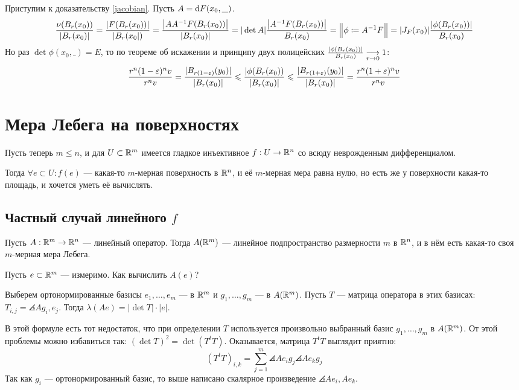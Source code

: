 \documentclass[a4paper]{report}
\begin{document}
    Приступим к доказательству \eqref{jacobian}.
    Пусть $A = \operatorname{d}\! F(x_0, \_)$.
    \[\frac{\nu(B_r(x_0))}{|B_r(x_0)|} = \frac{|F(B_r(x_0))|}{|B_r(x_0|)} = \frac{\left|AA^{-1}F(B_r(x_0))\right|}{\left|B_r(x_0)\right|} = |\det A|\frac{\left|A^{-1}F(B_r(x_0))\right|}{B_r(x_0)} =\Big\|\phi \coloneqq A^{-1}F\Big\|= |J_F(x_0)|\frac{|\phi(B_r(x_0))|}{B_r(x_0)}\]
    Но раз $\det \phi(x_0, \_) =E$, то по теореме об искажении и принципу двух полицейских ${\frac{|\phi(B_r(x_0))|}{B_r(x_0)} \underset{r \to 0}{\longrightarrow} 1}$:
    \[\frac{r^n (1 - \varepsilon)^n v}{r^n v} = \frac{|B_{r(1 - \varepsilon)}(y_0)|}{|B_r(x_0)|} \leqslant \frac{|\phi(B_r(x_0))}{|B_r(x_0)|}\leqslant \frac{|B_{r(1 + \varepsilon)}(y_0)|}{|B_r(x_0)|} = \frac{r^n(1 + \varepsilon)^n v}{r^n v}\]
    \section{Мера Лебега на поверхностях}
    Пусть теперь $m \le n$, и для $U \subset \mathbb{R}^m$ имеется гладкое инъективное $f: U \rightarrow \mathbb{R}^n$ со всюду неврожденным дифференциалом.

    Тогда $\forall e \subset U: f(e)$ --- какая-то $m$-мерная поверхность в $\mathbb{R}^n$, и её $m$-мерная мера равна нулю, но есть же у поверхности какая-то площадь, и хочется уметь её вычислять.
    \subsection{Частный случай линейного $f$}
    Пусть $A: \mathbb{R}^m \rightarrow \mathbb{R}^n$ --- линейный оператор.
    Тогда $A(\mathbb{R}^m)$ --- линейное подпространство размерности $m$ в $\mathbb{R}^n$, и в нём есть какая-то своя $m$-мерная мера Лебега.

    Пусть $e \subset \mathbb{R}^m$ --- измеримо.
    Как вычислить $A(e)$?

    Выберем ортонормированные базисы $e_1, \dots, e_m$ --- в $\mathbb{R}^m$ и $g_1, \dots, g_m$ --- в $A(\mathbb{R}^m)$.
    Пусть $T$ --- матрица оператора в этих базисах: $T_{i,j} = \angles{A g_i, e_j}$.
    Тогда $\lambda(Ae) = |\det T|\cdot|e|$.

    В этой формуле есть тот недостаток, что при определении $T$ используется произвольно выбранный базис $g_1, \dots, g_m$ в $A(\mathbb{R}^m)$.
    От этой проблемы можно избавиться так: $(\det T)^2 = \det(T^t T)$.
    Оказывается, матрица $T^t T$ выглядит приятно:
    \[(T^t T)_{i,k} = \sum\limits_{j = 1}^{m}\angles{A e_i g_j}\angles{A e_k g_j}\]
    Так как $g_{i}$ --- ортонормированный базис, то выше написано скалярное произведение $\angles{Ae_i, A e_k}$.
\end{document}

